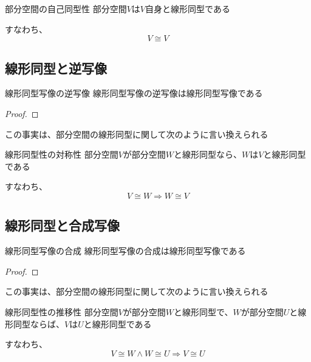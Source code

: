 \documentclass[../../../topic_linear-algebra]{subfiles}
\begin{document}
\begin{theorem}{部分空間の自己同型性}
  部分空間$V$は$V$自身と線形同型である

  すなわち、
  \begin{equation*}
    V \cong V
  \end{equation*}
\end{theorem}

\subsection{線形同型と逆写像}

\begin{theorem}{線形同型写像の逆写像}
  線形同型写像の逆写像は線形同型写像である
\end{theorem}

\begin{proof}
\end{proof}

この事実は、部分空間の線形同型に関して次のように言い換えられる

\begin{theorem}{線形同型性の対称性}
  部分空間$V$が部分空間$W$と線形同型なら、$W$は$V$と線形同型である

  すなわち、
  \begin{equation*}
    V \cong W \Longrightarrow W \cong V
  \end{equation*}
\end{theorem}

\subsection{線形同型と合成写像}

\begin{theorem}{線形同型写像の合成}
  線形同型写像の合成は線形同型写像である
\end{theorem}

\begin{proof}
\end{proof}

この事実は、部分空間の線形同型に関して次のように言い換えられる

\begin{theorem}{線形同型性の推移性}
  部分空間$V$が部分空間$W$と線形同型で、$W$が部分空間$U$と線形同型ならば、$V$は$U$と線形同型である

  すなわち、
  \begin{equation*}
    V \cong W \land W \cong U \Longrightarrow V \cong U
  \end{equation*}
\end{theorem}
\end{document}
